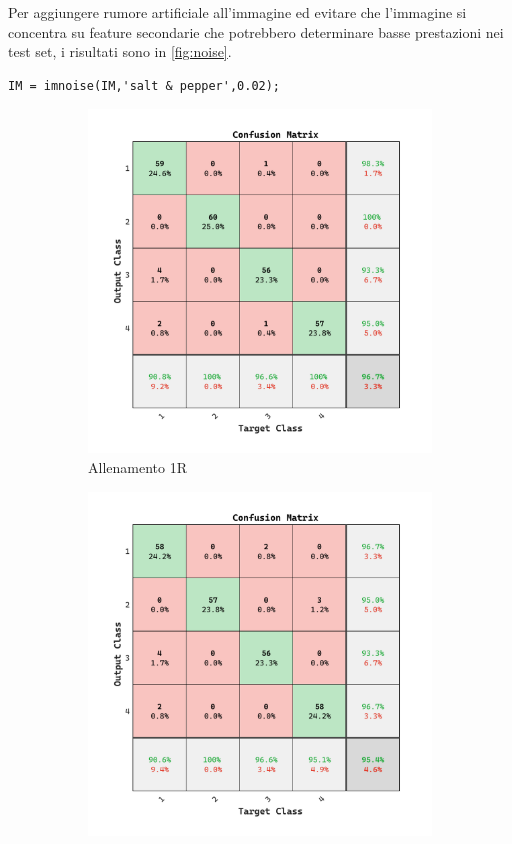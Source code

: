 Per aggiungere rumore artificiale all'immagine ed evitare che l'immagine si concentra su feature secondarie che potrebbero determinare basse prestazioni nei test set, i risultati sono in \cref{fig:noise}.

\begin{lstlisting}
IM = imnoise(IM,'salt & pepper',0.02);
\end{lstlisting}

\begin{figure}[ht]
    \centering
    \begin{subfigure}{0.45\textwidth}
        \includegraphics[width=\textwidth]{addestramento-rete-neurale/one-noise.pdf}
        \caption{Allenamento 1R} 
    \end{subfigure}
    \begin{subfigure}{0.45\textwidth}
        \includegraphics[width=\textwidth]{addestramento-rete-neurale/two-noise.pdf}

\end{subfigure}
\end{figure}
